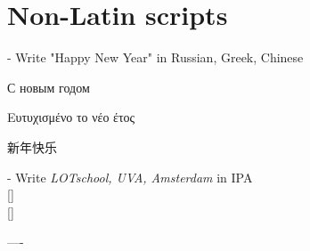 \section{Non-Latin scripts}
- Write "Happy New Year" in Russian, Greek, Chinese 

С новым годом

Ευτυχισμένο το νέο έτος

\newfontfamily{}
\newcommand{\zh}[1]{{\cn #1}} 
{\cn 新年快乐}


- Write \textit{LOTschool, UVA, Amsterdam} in IPA\\{}
[\textipa{"lO\|[t sxo:l, "y:fa:, Amst@r"\|[dAm}]\\{}
[]

----

